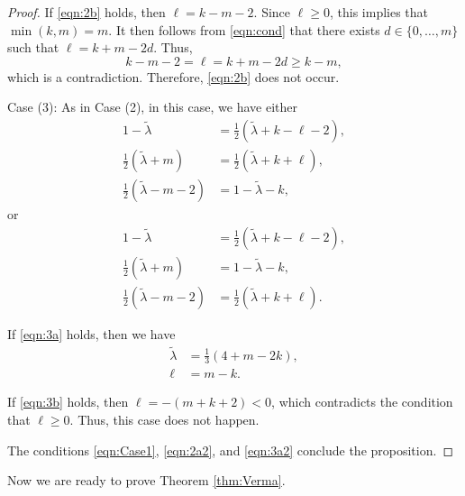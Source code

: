 \documentclass[reqno,11pt]{amsart}
\theoremstyle{remark}
\numberwithin{equation}{section}
\newcommand{\wlambda}{\widetilde{\lambda}}
\begin{document}
\begin{proof}
If \eqref{eqn:2b} holds, then $\ell=k-m-2$. 
Since $\ell \geq 0$, this implies that $\min(k,m)=m$.
It then follows from \eqref{eqn:cond} that there exists $d \in \{0,\ldots, m\}$ such that
$\ell = k+m-2d$. Thus,
\begin{equation*}
k-m-2=\ell =k+m-2d \geq k-m,
\end{equation*}
which is a contradiction. Therefore, \eqref{eqn:2b} does not occur. 

\vskip 0.1in

\item 
Case (3): 
As in Case (2), in this case, we have either
\begin{equation}\label{eqn:3a}
\begin{aligned}
1-\wlambda &= \tfrac{1}{2}(\wlambda+k-\ell-2),\\
\tfrac{1}{2}(\wlambda+m) &=\tfrac{1}{2}(\wlambda+k+\ell),\\
\tfrac{1}{2}(\wlambda-m-2)&=1-\wlambda-k,
\end{aligned}
\end{equation}
or
\begin{equation}\label{eqn:3b}
\begin{aligned}
1-\wlambda &= \tfrac{1}{2}(\wlambda+k-\ell-2),\\
\tfrac{1}{2}(\wlambda+m)&=1-\wlambda-k,\\
\tfrac{1}{2}(\wlambda-m-2) &=\tfrac{1}{2}(\wlambda+k+\ell).
\end{aligned}
\end{equation}

If \eqref{eqn:3a} holds, then we have
\begin{equation}\label{eqn:3a2}
\begin{aligned}
\wlambda&=\frac{1}{3}(4+m-2k),\\
\ell&=m-k.
\end{aligned}
\end{equation}

If \eqref{eqn:3b} holds, then $\ell=-(m+k+2) < 0$, which contradicts 
the condition that  $\ell \geq 0$. 
Thus, this case does not happen.

The conditions \eqref{eqn:Case1}, \eqref{eqn:2a2},
and \eqref{eqn:3a2} conclude the proposition.
\end{proof}

Now we are ready to prove Theorem \ref{thm:Verma}.
\end{document}
